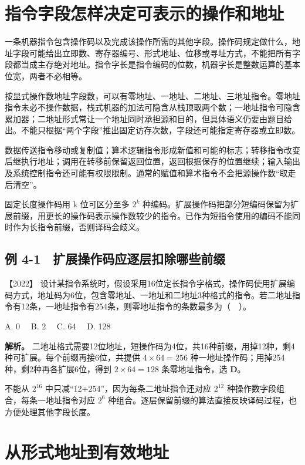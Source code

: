 \section{指令字段怎样决定可表示的操作和地址}\label{co-04-01}

一条机器指令包含操作码以及完成该操作所需的其他字段。操作码规定做什么，地址字段可能给出立即数、寄存器编号、形式地址、位移或寻址方式，不能把所有字段都当成主存绝对地址。指令字长是指令编码的位数，机器字长是整数运算的基本位宽，两者不必相等。

按显式操作数地址字段数，可以有零地址、一地址、二地址、三地址指令。零地址指令未必不操作数据，栈式机器的加法可隐含从栈顶取两个数；一地址指令可隐含累加器；二地址形式常让一个地址同时承担源和目的，但具体语义仍要由题目给出。不能只根据``两个字段''推出固定访存次数，字段还可能指定寄存器或立即数。

数据传送指令移动或复制值；算术逻辑指令形成新值和可能的标志；转移指令改变后继执行地址；调用在转移前保留返回位置，返回根据保存的位置继续；输入输出及系统控制指令还可能有权限限制。通常的赋值和算术指令不会把源操作数``取走后清空''。

固定长度操作码用 k 位可区分至多 \(2^k\) 种编码。扩展操作码把部分短编码保留为扩展前缀，用更长的操作码表示操作数较少的指令。已作为短指令使用的编码不能同时作为长指令前缀，否则译码会歧义。

\subsection{例 4-1　扩展操作码应逐层扣除哪些前缀}\label{co-ex4-1}

\noindent{}【2022】 设计某指令系统时，假设采用16位定长指令字格式，操作码使用扩展编码方式，地址码为6位，包含零地址、一地址和二地址3种格式的指令。若二地址指令有12条，一地址指令有254条，则零地址指令的条数最多为（　）。

A. 0　 B. 2　 C. 64　 D. 128


\textbf{解析。} 二地址格式需要12位地址，短操作码为4位，共16种前缀，用掉12种，剩4种可扩展。每个前缀再接6位，共提供 \(4\times64=256\) 种一地址操作码；用掉254种，剩2种再各扩展6位，得到 \(2\times64=128\) 条零地址指令，选 \textbf{D}。

不能从 \(2^{16}\) 中只减``12+254''，因为每条二地址指令还对应 \(2^{12}\) 种操作数字段组合，每条一地址指令对应 \(2^6\) 种组合。逐层保留前缀的算法直接反映译码过程，也方便处理其他字段长度。

\section{从形式地址到有效地址}\label{co-04-02}

